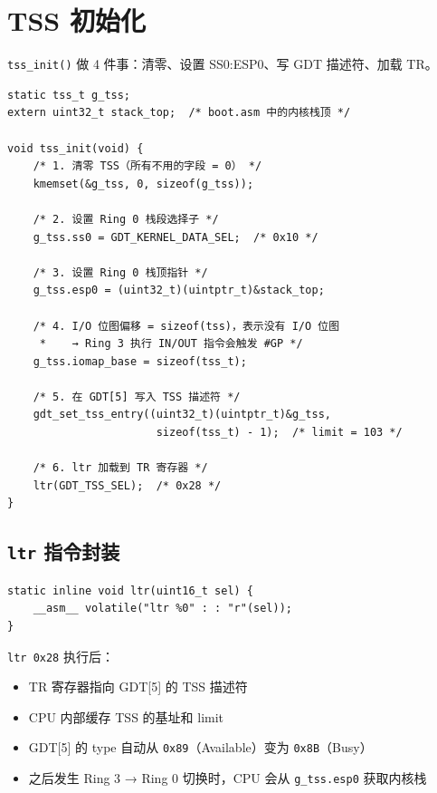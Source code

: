 \section{TSS 初始化}
\label{sec:tss-init}

\texttt{tss\_init()} 做 4 件事：清零、设置 SS0:ESP0、写 GDT 描述符、加载 TR。

\begin{lstlisting}[style=cstyle]
static tss_t g_tss;
extern uint32_t stack_top;  /* boot.asm 中的内核栈顶 */

void tss_init(void) {
    /* 1. 清零 TSS（所有不用的字段 = 0） */
    kmemset(&g_tss, 0, sizeof(g_tss));

    /* 2. 设置 Ring 0 栈段选择子 */
    g_tss.ss0 = GDT_KERNEL_DATA_SEL;  /* 0x10 */

    /* 3. 设置 Ring 0 栈顶指针 */
    g_tss.esp0 = (uint32_t)(uintptr_t)&stack_top;

    /* 4. I/O 位图偏移 = sizeof(tss)，表示没有 I/O 位图
     *    → Ring 3 执行 IN/OUT 指令会触发 #GP */
    g_tss.iomap_base = sizeof(tss_t);

    /* 5. 在 GDT[5] 写入 TSS 描述符 */
    gdt_set_tss_entry((uint32_t)(uintptr_t)&g_tss,
                       sizeof(tss_t) - 1);  /* limit = 103 */

    /* 6. ltr 加载到 TR 寄存器 */
    ltr(GDT_TSS_SEL);  /* 0x28 */
}
\end{lstlisting}

\subsection{\texttt{ltr} 指令封装}

\begin{lstlisting}[style=cstyle]
static inline void ltr(uint16_t sel) {
    __asm__ volatile("ltr %0" : : "r"(sel));
}
\end{lstlisting}

\begin{cpustate}
\texttt{ltr 0x28} 执行后：
\begin{itemize}
  \item TR 寄存器指向 GDT[5] 的 TSS 描述符
  \item CPU 内部缓存 TSS 的基址和 limit
  \item GDT[5] 的 type 自动从 \texttt{0x89}（Available）变为 \texttt{0x8B}（Busy）
  \item 之后发生 Ring 3 → Ring 0 切换时，CPU 会从 \texttt{g\_tss.esp0} 获取内核栈
\end{itemize}
\end{cpustate}

